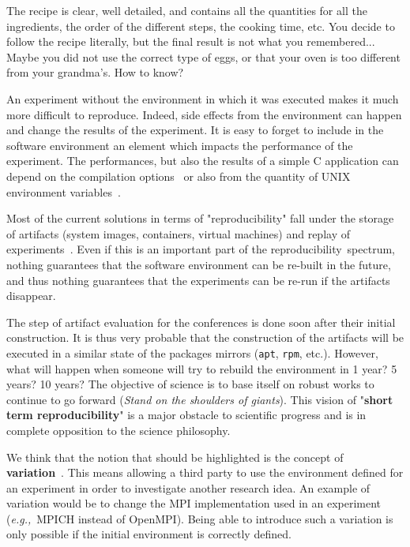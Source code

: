\documentclass[sigconf]{acmart}
\newcommand{\repro}{reproducibility}
\newcommand{\eg}{\emph{e.g.,}}
\begin{document}
The recipe is clear, well detailed, and contains all the quantities for all the ingredients, the order of the different steps, the cooking time, etc.
You decide to follow the recipe literally, but the final result is not what you remembered...
Maybe you did not use the correct type of eggs, or that your oven is too different from your grandma's.
How to know?


An experiment without the environment in which it was executed makes it much more difficult to reproduce.
Indeed, side effects from the environment can happen and change the results of the experiment.
It is easy to forget to include in the software environment an element which impacts the performance of the experiment.
The performances, but also the results of a simple C application can depend on the compilation options\ \cite{stodden2018assessing} or also from the quantity of UNIX environment variables\ \cite{mytkowicz2009producing}.

Most of the current solutions in terms of "\repro" fall under the storage of artifacts (system images, containers, virtual machines) and replay of experiments\ \cite{rosendo2020e2clab, brammer2011paper, brinckman2019computing}.
Even if this is an important part of the \repro\ spectrum, nothing guarantees that the software environment can be re-built in the future, and thus nothing guarantees that the experiments can be re-run if the artifacts disappear. 


The step of artifact evaluation for the conferences is done soon after their initial construction.
It is thus very probable that the construction of the artifacts will be executed in a similar state of the packages mirrors (\texttt{apt}, \texttt{rpm}, etc.).
However, what will happen when someone will try to rebuild the environment in 1 year? 5 years? 10 years?
The objective of science is to base itself on robust works to continue to go forward (\emph{Stand on the shoulders of giants}).
This vision of "\textbf{short term reproducibility}" is a major obstacle to scientific progress and is in complete opposition to the science philosophy.


We think that the notion that should be highlighted is the concept of \textbf{variation}\ \cite{mercier2018considering, feitelson_repeatability_2015}.
This means allowing a third party to use the environment defined for an experiment in order to investigate another research idea.
An example of variation would be to change the MPI implementation used in an experiment (\eg\ MPICH instead of OpenMPI).
Being able to introduce such a variation is only possible if the initial environment is correctly defined.
\end{document}
